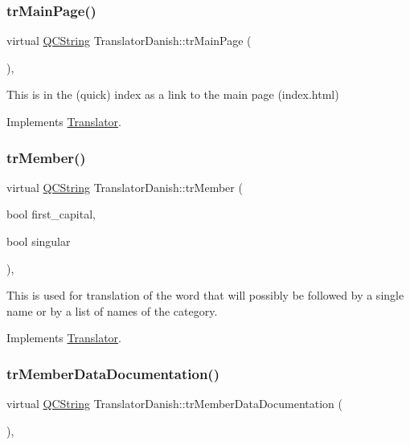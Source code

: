 \subsubsection{\texorpdfstring{trMainPage()}{trMainPage()}}
{\footnotesize\ttfamily virtual \mbox{\hyperlink{class_q_c_string}{Q\+C\+String}} Translator\+Danish\+::tr\+Main\+Page (\begin{DoxyParamCaption}{ }\end{DoxyParamCaption})\hspace{0.3cm}{\ttfamily [inline]}, {\ttfamily [virtual]}}

This is in the (quick) index as a link to the main page (index.\+html) 

Implements \mbox{\hyperlink{class_translator}{Translator}}.

\mbox{\label{class_translator_danish_a47299e4b6d01f9bdd0a60eb72d3a5f64}} 
\subsubsection{\texorpdfstring{trMember()}{trMember()}}
{\footnotesize\ttfamily virtual \mbox{\hyperlink{class_q_c_string}{Q\+C\+String}} Translator\+Danish\+::tr\+Member (\begin{DoxyParamCaption}\item[{bool}]{first\+\_\+capital,  }\item[{bool}]{singular }\end{DoxyParamCaption})\hspace{0.3cm}{\ttfamily [inline]}, {\ttfamily [virtual]}}

This is used for translation of the word that will possibly be followed by a single name or by a list of names of the category. 

Implements \mbox{\hyperlink{class_translator}{Translator}}.

\mbox{\label{class_translator_danish_a02f49a5be5bb94262215075ff3e03037}} 
\subsubsection{\texorpdfstring{trMemberDataDocumentation()}{trMemberDataDocumentation()}}
{\footnotesize\ttfamily virtual \mbox{\hyperlink{class_q_c_string}{Q\+C\+String}} Translator\+Danish\+::tr\+Member\+Data\+Documentation (\begin{DoxyParamCaption}{ }\end{DoxyParamCaption})\hspace{0.3cm}{\ttfamily [inline]}, {\ttfamily [virtual]}}

